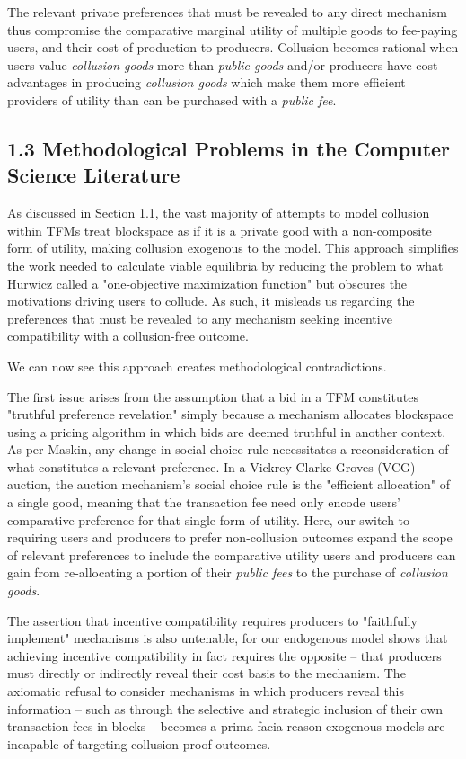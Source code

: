 \documentclass[oneside]{article}   	%
\begin{document}
The relevant private preferences that must be revealed to any direct mechanism thus compromise the comparative marginal utility of multiple goods to fee-paying users, and their cost-of-production to producers. Collusion becomes rational when users value \textit{collusion goods} more than \textit{public goods} and/or producers have cost advantages in producing \textit{collusion goods} which make them more efficient providers of utility than can be purchased with a \textit{public fee}.

\subsection*{1.3 Methodological Problems in the Computer Science Literature}

As discussed in Section 1.1, the vast majority of attempts to model collusion within TFMs treat blockspace as if it is a private good with a non-composite form of utility, making collusion exogenous to the model. This approach simplifies the work needed to calculate viable equilibria by reducing the problem to what Hurwicz called a "one-objective maximization function" but obscures the motivations driving users to collude. As such, it misleads us regarding the preferences that must be revealed to any mechanism seeking incentive compatibility with a collusion-free outcome. 

We can now see this approach creates methodological contradictions.

The first issue arises from the assumption that a bid in a TFM constitutes "truthful preference revelation" simply because a mechanism allocates blockspace using a pricing algorithm in which bids are deemed truthful in another context. As per Maskin, any change in social choice rule necessitates a reconsideration of what constitutes a relevant preference. In a Vickrey-Clarke-Groves (VCG) auction, the auction mechanism's social choice rule is the "efficient allocation" of a single good, meaning that the transaction fee need only encode users' comparative preference for that single form of utility. Here, our switch to requiring users and producers to prefer non-collusion outcomes expand the scope of relevant preferences to include the comparative utility users and producers can gain from re-allocating a portion of their \textit{public fees} to the purchase of \textit{collusion goods}.

The assertion that incentive compatibility requires producers to "faithfully implement" mechanisms is also untenable, for our endogenous model shows that achieving incentive compatibility in fact requires the opposite -- that producers must directly or indirectly reveal their cost basis to the mechanism. The axiomatic refusal to consider mechanisms in which producers reveal this information -- such as through the selective and strategic inclusion of their own transaction fees in blocks -- becomes a prima facia reason exogenous models are incapable of targeting collusion-proof outcomes.
\end{document}
